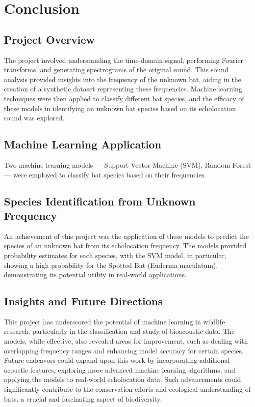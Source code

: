 \documentclass[12pt]{article}
\begin{document}
\section{Conclusion}

\subsection{Project Overview}
The project involved understanding the time-domain signal, performing Fourier transforms, and generating spectrograms of the original sound. This sound analysis provided insights into the frequency of the unknown bat, aiding in the creation of a synthetic dataset representing these frequencies. Machine learning techniques were then applied to classify different bat species, and the efficacy of these models in identifying an unknown bat species based on its echolocation sound was explored.
\subsection{Machine Learning Application}
Two machine learning models — Support Vector Machine (SVM), Random Forest — were employed to classify bat species based on their frequencies.
\subsection{Species Identification from Unknown Frequency}
An achievement of this project was the application of these models to predict the species of an unknown bat from its echolocation frequency. The models provided probability estimates for each species, with the SVM model, in particular, showing a high probability for the Spotted Bat (Euderma maculatum), demonstrating its potential utility in real-world applications.

\subsection{Insights and Future Directions}
This project has underscored the potential of machine learning in wildlife research, particularly in the classification and study of bioacoustic data. The models, while effective, also revealed areas for improvement, such as dealing with overlapping frequency ranges and enhancing model accuracy for certain species.
Future endeavors could expand upon this work by incorporating additional acoustic features, exploring more advanced machine learning algorithms, and applying the models to real-world echolocation data. Such advancements could significantly contribute to the conservation efforts and ecological understanding of bats, a crucial and fascinating aspect of biodiversity.
\end{document}
